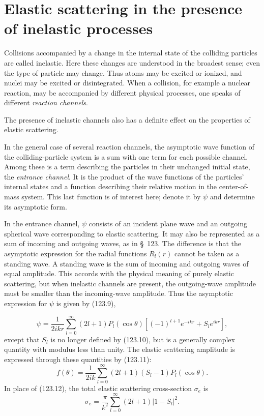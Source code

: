 \section{Elastic scattering in the presence of inelastic processes}

Collisions accompanied by a change in the internal state of the colliding
particles are called inelastic. Here these changes are understood in the
broadest sense; even the type of particle may change. Thus atoms may be
excited or ionized, and nuclei may be excited or disintegrated. When a
collision, for example a nuclear reaction, may be accompanied by different
physical processes, one speaks of different \emph{reaction channels}.

The presence of inelastic channels also has a definite effect on the
properties of elastic scattering.

In the general case of several reaction channels, the asymptotic wave
function of the colliding-particle system is a sum with one term for each
possible channel. Among these is a term describing the particles in their
unchanged initial state, the \emph{entrance channel}. It is the product of the
wave functions of the particles' internal states and a function describing
their relative motion in the center-of-mass system. This last function is of
interest here; denote it by $\psi$ and determine its asymptotic form.

In the entrance channel, $\psi$ consists of an incident plane wave and an
outgoing spherical wave corresponding to elastic scattering. It may also be
represented as a sum of incoming and outgoing waves, as in \S~123. The
difference is that the asymptotic expression for the radial functions
$R_l(r)$ cannot be taken as a standing wave. A standing wave is the sum of
incoming and outgoing waves of equal amplitude. This accords with the
physical meaning of purely elastic scattering, but when inelastic channels
are present, the outgoing-wave amplitude must be smaller than the
incoming-wave amplitude. Thus the asymptotic expression for $\psi$ is given
by (123.9),

\begin{equation}
 \psi=\frac1{2ikr}\sum_{l=0}^{\infty}(2l+1)P_l(\cos\theta)
 \left[(-1)^{l+1}e^{-ikr}+S_le^{ikr}\right],
 \tag{142.1}
\end{equation}
except that $S_l$ is no longer defined by (123.10), but is a generally
complex quantity with modulus less than unity. The elastic scattering
amplitude is expressed through these quantities by (123.11):
\begin{equation}
 f(\theta)=\frac1{2ik}\sum_{l=0}^{\infty}(2l+1)(S_l-1)P_l(\cos\theta).
 \tag{142.2}
\end{equation}
In place of (123.12), the total elastic scattering cross-section $\sigma_e$ is
\begin{equation}
 \sigma_e=\frac{\pi}{k^2}\sum_{l=0}^{\infty}(2l+1)|1-S_l|^2.
 \tag{142.3}
\end{equation}

